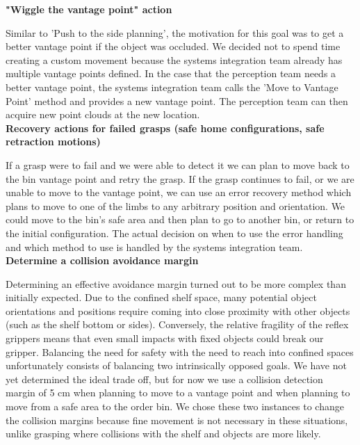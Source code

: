 \documentclass[12pt]{article}
\begin{document}
\noindent\textbf{"Wiggle the vantage point" action}

Similar to 'Push to the side planning', the motivation for this goal was to get a better vantage point if the object was occluded. We decided not to spend time creating a custom movement because the systems integration team already has multiple vantage points defined. In the case that the perception team needs a better vantage point, the systems integration team calls the 'Move to Vantage Point' method and provides a new vantage point. The perception team can then acquire new point clouds at the new location.\\

\noindent\textbf{Recovery actions for failed grasps (safe home configurations, safe retraction motions)}

If a grasp were to fail and we were able to detect it we can plan to move back to the bin vantage point and retry the grasp. If the grasp continues to fail, or we are unable to move to the vantage point, we can use an error recovery method which plans to move to one of the limbs to any arbitrary position and orientation. We could move to the bin's safe area and then plan to go to another bin, or return to the initial configuration. The actual decision on when to use the error handling and which method to use is handled by the systems integration team.\\

\noindent\textbf{Determine a collision avoidance margin}

Determining an effective avoidance margin turned out to be more complex than initially expected. Due to the confined shelf space, many potential object orientations and positions require coming into close proximity with other objects (such as the shelf bottom or sides). Conversely, the relative fragility of the reflex grippers means that even small impacts with fixed objects could break our gripper. Balancing the need for safety with the need to reach into confined spaces unfortunately consists of balancing two intrinsically opposed goals. We have not yet determined the ideal trade off, but for now we use a collision detection margin of 5 cm when planning to move to a vantage point and when planning to move from a safe area to the order bin. We chose these two instances to change the collision margins because fine movement is not necessary in these situations, unlike grasping where collisions with the shelf and objects are more likely.\\
\end{document}
